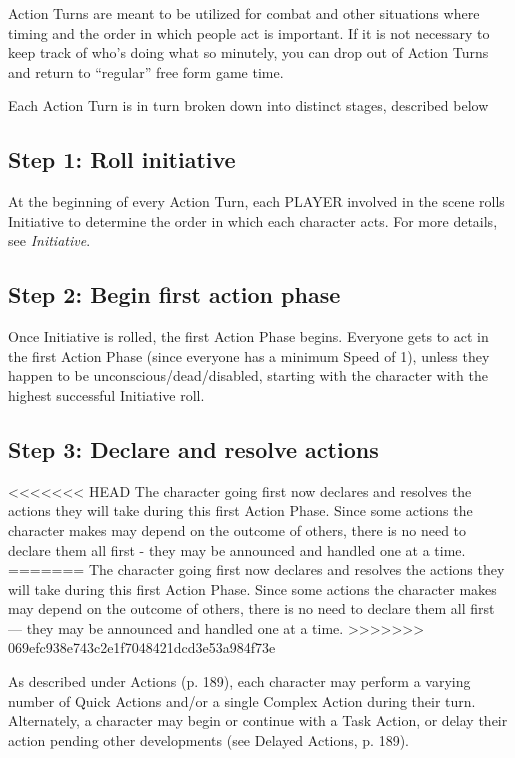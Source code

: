 Action Turns are meant to be utilized for combat and other situations where timing and the order in which people act is important. If it is not necessary to keep track of who’s doing what so minutely, you can drop out of Action Turns and return to ``regular'' free form game time.

Each Action Turn is in turn broken down into distinct stages, described below


\subsection{Step 1: Roll initiative}
\label{sec:roll-initiative}

At the beginning of every Action Turn, each PLAYER involved in the scene rolls Initiative to determine the order in which each character acts. For more details, see \emph{Initiative}.


\subsection{Step 2: Begin first action phase}
\label{sec:begin-first-phase}

Once Initiative is rolled, the first Action Phase begins. Everyone gets to act in the first Action Phase (since everyone has a minimum Speed of 1), unless they happen to be unconscious/dead/disabled, starting with the character with the highest successful Initiative roll.


\subsection{Step 3: Declare and resolve actions}
\label{sec:declare-resolve}

<<<<<<< HEAD
The character going first now declares and resolves the actions they will take during this first Action Phase. Since some actions the character makes may depend on the outcome of others, there is no need to declare them all first - they may be announced and handled one at a time.
=======
The character going first now declares and resolves the actions they will take during this first Action Phase. Since some actions the character makes may depend on the outcome of others, there is no need to declare them all first --- they may be announced and handled one at a time.
>>>>>>> 069efc938e743c2e1f7048421dcd3e53a984f73e

As described under Actions (p. 189), each character may perform a varying number of Quick Actions and/or a single Complex Action during their turn. Alternately, a character may begin or continue with a Task Action, or delay their action pending other developments (see Delayed Actions, p. 189).

